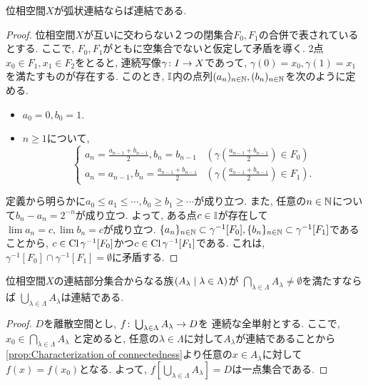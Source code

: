 \documentclass[uplatex, dvipdfmx, a4paper, 12pt, class=jsbook, crop=false]{standalone}
\begin{document}
\begin{proposition}
	\label{prop:PathCtd>Ctd}
	位相空間$ X $が弧状連結ならば連結である.
\end{proposition}

\begin{proof}
	位相空間$ X $が互いに交わらない２つの閉集合$ F_0, F_1 $の合併で表されているとする.
	ここで, $ F_0, F_1 $がともに空集合でないと仮定して矛盾を導く.
	2点$ x_0 \in F_1, x_1 \in F_2 $をとると, 連続写像$ \gamma\colon I\to X $であって,
	$ \gamma(0) = x_0, \gamma(1) = x_1 $を満たすものが存在する.
	このとき, $ \mathbb{I} $内の点列$ (a_n)_{n\in \mathbb{N}}, (b_n)_{n \in \mathbb{N}} $を次のように定める.
	\begin{itemize}
		\item $ a_0 = 0, b_0 = 1 $.
		\item $ n \geq 1 $について,
		\begin{equation}
			\begin{cases}
				a_n = \frac{a_{n-1} + b_{n-1}}{2}, b_n = b_{n-1} & (\gamma\left(\frac{a_{n-1} + b_{n-1}}{2}\right) \in F_0) \\
				a_n = a_{n-1}, b_n = \frac{a_{n-1} + b_{n-1}}{2} & (\gamma\left(\frac{a_{n-1} + b_{n-1}}{2}\right) \in F_1).
			\end{cases}
		\end{equation}
	\end{itemize}
	定義から明らかに$ a_0 \leq a_1 \leq \cdots, b_0 \geq b_1 \geq \cdots $が成り立つ.
	また, 任意の$ n \in \mathbb{N} $について$ b_n - a_n = 2^{-n} $が成り立つ.
	よって, ある点$ c \in \mathbb{I} $が存在して$ \lim a_n = c, \lim b_n = c $が成り立つ.
	$ \{a_n\}_{n \in \mathbb{N}} \subset \gamma^{-1}[F_0], \{b_n\}_{n \in \mathbb{N}} \subset \gamma^{-1}[F_1] $であることから,
	$ c \in \mathop{\mathrm{Cl}}\nolimits{\gamma^{-1}[F_0]} $かつ$ c \in \mathop{\mathrm{Cl}}\nolimits{\gamma^{-1}[F_1]} $である.
	これは, $ \gamma^{-1}[F_0] \cap \gamma^{-1}[F_1] = \emptyset $に矛盾する.
\end{proof}

\begin{proposition}
	\label{prop:Sum of every connected subsets in a family having intersection is connected}
	位相空間$ X $の連結部分集合からなる族$ \setfamily{A_\lambda}{\lambda \in \Lambda} $が
	$ \bigcap_{\lambda \in \Lambda} A_\lambda \neq \emptyset $を満たすならば
	$ \bigcup_{\lambda \in \Lambda} A_\lambda $は連結である.
\end{proposition}

\begin{proof}
	$ D $を離散空間とし, $ f\colon\bigcup_{\lambda \in \Lambda} A_\lambda\to D $を
	連続な全単射とする. ここで, $ x_0 \in \bigcap_{\lambda \in \Lambda} A_\lambda $
	と定めると, 任意の$ \lambda \in \Lambda $に対して$ A_\lambda $が連結であることから
	\cref{prop:Characterization of connectedness}より任意の$ x \in A_\lambda $に対して
	$ f(x) = f(x_0) $となる.
	よって, $ f[\bigcup_{\lambda \in \Lambda} A_\lambda] = D $は一点集合である.
\end{proof}
\end{document}

